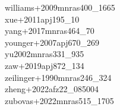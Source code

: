 \documentclass{article}
\begin{document}
\noindent williams+2009mnras400_1665 \color{black} \\
\noindent xue+2011apj195_10 \color{black} \\
\noindent yang+2017mnras464_70 \color{black} \\
\noindent younger+2007apj670_269 \color{black} \\
\noindent yu2002mnras331_935 \color{black} \\
\noindent zaw+2019apj872_134 \color{black} \\
\noindent zeilinger+1990mnras246_324 \color{black} \\
\noindent zheng+2022afz22_085004 \color{black} \\
\noindent zubovas+2022mnras515_1705 \color{black} \\
\end{document}
